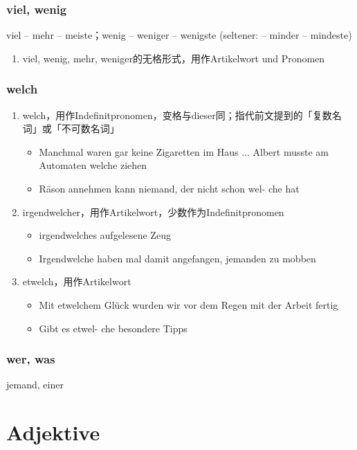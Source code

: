 \documentclass[UTF8]{report}
\begin{document}
\subsection{viel, wenig}
viel – mehr – meiste；wenig – weniger – wenigste (seltener: – minder – mindeste)
\begin{enumerate}
    \item viel, wenig, mehr, weniger的无格形式，用作Artikelwort und Pronomen
\end{enumerate}

\subsection{welch}
\begin{enumerate}
    \item welch，用作Indefinitpronomen，变格与dieser同；指代前文提到的「复数名词」或「不可数名词」
    \begin{itemize}
        \item Manchmal waren gar keine Zigaretten im Haus ... Albert musste am Automaten welche ziehen
        \item Räson annehmen kann niemand, der nicht schon wel- che hat
    \end{itemize}
    \item irgendwelcher，用作Artikelwort，少数作为Indefinitpronomen
    \begin{itemize}
        \item irgendwelches aufgelesene Zeug
        \item Irgendwelche haben mal damit angefangen, jemanden zu mobben
    \end{itemize}
    \item etwelch，用作Artikelwort
    \begin{itemize}
        \item Mit etwelchem Glück wurden wir vor dem Regen mit der Arbeit fertig
        \item Gibt es etwel- che besondere Tipps
    \end{itemize}
\end{enumerate}

\subsection{wer, was}
jemand, einer


\chapter{Adjektive}
\end{document}
